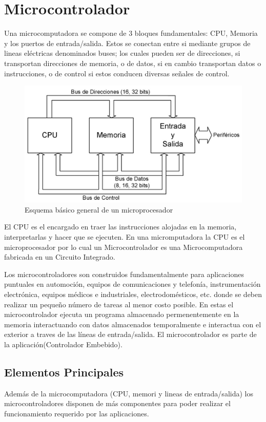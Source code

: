 \documentclass[letterpaper,12pt,oneside]{book}
\begin{document}
		\section{Microcontrolador}
		Una microcomputadora se compone de 3 bloques fundamentales: CPU, Memoria y los puertos de entrada/salida. Estos se conectan entre si mediante grupos de lineas eléctricas denominados buses; los cuales pueden ser de direcciones, si transportan direcciones de memoria, o de datos, si en cambio transportan datos o instrucciones, o de control si estos conducen diversas señales de control.

		\begin{figure}[!htpb]
			\centering
			\includegraphics[scale = 1.0]{Material de Consulta/EsqMicro.PNG}
			\caption[Esquema básico general de un microprocesador]{Esquema básico general de un microprocesador}
			\label{EsqMicro}
		\end{figure}

		El CPU es el encargado en traer las instrucciones alojadas en la memoria, interpretarlas y hacer que se ejecuten. En una micromputadora la CPU es el microprocesador por lo cual un Microcontrolador es una Microcomputadora fabricada en un Circuito Integrado.

		Los microcontroladores son construidos fundamentalmente para aplicaciones puntuales en automoción, equipos de comunicaciones y telefonía, instrumentación electrónica, equipos médicos e industriales, electrodomésticos, etc. donde se deben realizar un pequeño número de tareas al menor costo posible. En estas el microcontrolador ejecuta un programa almacenado permenentemente en la memoria interactuando con datos almacenados temporalmente e interactua con el exterior a traves de las líneas de entrada/salida. El microcontrolador es parte de la aplicación(Controlador Embebido).

			\subsection{Elementos Principales}
			Además de la microcomputadora (CPU, memori y lineas de entrada/salida) los microcontroladores disponen de más componentes para poder realizar el funcionamiento requerido por las aplicaciones.
\end{document}
